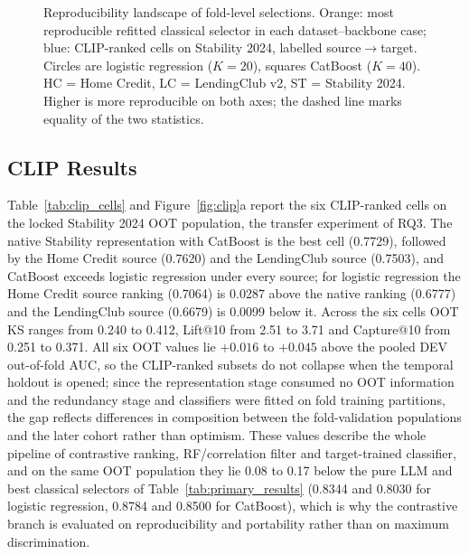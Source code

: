 \documentclass[final,5p,twocolumn]{elsarticle}
\newcommand{\Kfeat}{K}
\begin{document}
\begin{figure}[htbp]
\caption{Reproducibility landscape of fold-level selections. Orange: most reproducible refitted classical selector in each dataset--backbone case; blue: CLIP-ranked cells on Stability 2024, labelled source$\rightarrow$target. Circles are logistic regression ($\Kfeat=20$), squares CatBoost ($\Kfeat=40$). HC = Home Credit, LC = LendingClub v2, ST = Stability 2024. Higher is more reproducible on both axes; the dashed line marks equality of the two statistics.}
\label{fig:stability}
\end{figure}

\subsection{CLIP Results}
\label{subsec:clip_results}

Table~\ref{tab:clip_cells} and Figure~\ref{fig:clip}a report the six CLIP-ranked cells on the locked Stability 2024 OOT population, the transfer experiment of RQ3. The native Stability representation with CatBoost is the best cell (0.7729), followed by the Home Credit source (0.7620) and the LendingClub source (0.7503), and CatBoost exceeds logistic regression under every source; for logistic regression the Home Credit source ranking (0.7064) is 0.0287 above the native ranking (0.6777) and the LendingClub source (0.6679) is 0.0099 below it. Across the six cells OOT KS ranges from 0.240 to 0.412, Lift@10 from 2.51 to 3.71 and Capture@10 from 0.251 to 0.371. All six OOT values lie $+0.016$ to $+0.045$ above the pooled DEV out-of-fold AUC, so the CLIP-ranked subsets do not collapse when the temporal holdout is opened; since the representation stage consumed no OOT information and the redundancy stage and classifiers were fitted on fold training partitions, the gap reflects differences in composition between the fold-validation populations and the later cohort rather than optimism. These values describe the whole pipeline of contrastive ranking, RF/correlation filter and target-trained classifier, and on the same OOT population they lie 0.08 to 0.17 below the pure LLM and best classical selectors of Table~\ref{tab:primary_results} (0.8344 and 0.8030 for logistic regression, 0.8784 and 0.8500 for CatBoost), which is why the contrastive branch is evaluated on reproducibility and portability rather than on maximum discrimination.
\end{document}
